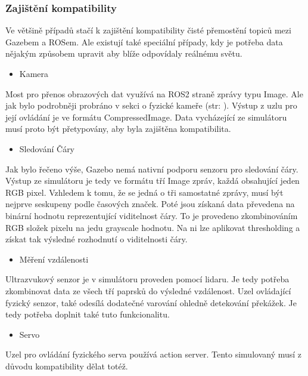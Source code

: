 \newpage
\subsubsection*{Zajištění kompatibility}
Ve většině případů stačí k zajištění kompatibility čisté přemostění topiců mezi Gazebem a ROSem. Ale existují také speciální případy, kdy je potřeba data nějakým způsobem upravit aby blíže odpovídaly reálnému světu. 

\begin{itemize}[leftmargin=*]
	\item{Kamera}
\end{itemize}
\vspace*{-0.5em}
Most pro přenos obrazových dat využívá na ROS2 straně zprávy typu Image. Ale jak bylo podrobněji probráno v sekci o fyzické kameře (str: \pageref{implementation:camera}). Výstup z uzlu pro její ovládání je ve formátu CompressedImage. Data vycházející ze simulátoru musí proto být přetypovány, aby byla zajištěna kompatibilita.

\begin{itemize}[leftmargin=*]
	\item{Sledování Čáry}
\end{itemize}
\vspace*{-0.5em}
Jak bylo řečeno výše, Gazebo nemá nativní podporu senzoru pro sledování čáry. Výstup ze simulátoru je tedy ve formátu tří Image zpráv, každá obsahující jeden RGB pixel. Vzhledem k tomu, že se jedná o tři samostatné zprávy, musí být nejprve seskupeny podle časových značek. Poté jsou získaná data převedena na binární hodnotu reprezentující viditelnost čáry. To je provedeno zkombinováním RGB složek pixelu na jedu grayscale hodnotu. Na ni lze aplikovat thresholding a získat tak výsledné rozhodnutí o viditelnosti čáry.

\begin{itemize}[leftmargin=*]
	\item{Měření vzdálenosti}
\end{itemize}
\vspace*{-0.5em}
Ultrazvukový senzor je v simulátoru proveden pomocí lidaru. Je tedy potřeba zkombinovat data ze všech tří paprsků do výsledné vzdálenost. Uzel ovládající fyzický senzor, také odesílá dodatečné varování ohledně detekování překážek. Je tedy potřeba doplnit také tuto funkcionalitu.

\begin{itemize}[leftmargin=*]
	\item{Servo}
\end{itemize}
\vspace*{-0.5em}
Uzel pro ovládání fyzického serva používá action server. Tento simulovaný musí z důvodu kompatibility dělat totéž.

